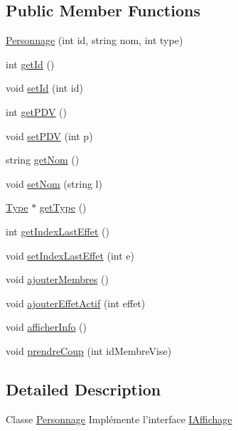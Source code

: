\subsection*{\-Public \-Member \-Functions}
\begin{DoxyCompactItemize}
\item 
\hyperlink{class_personnage_a962f03c014911e25449829891f1e2d15}{\-Personnage} (int id, string nom, int type)
\item 
int \hyperlink{class_personnage_a24fbf035171564c8cb2abff10642d73c}{get\-Id} ()
\item 
void \hyperlink{class_personnage_a5eaaea57f901cf1f04c1ee4752f03007}{set\-Id} (int id)
\item 
int \hyperlink{class_personnage_a8e5dab03a028a1c04b692f737c495979}{get\-P\-D\-V} ()
\item 
void \hyperlink{class_personnage_ada4855cf75754881b579a3a84aba2f47}{set\-P\-D\-V} (int p)
\item 
string \hyperlink{class_personnage_a519301399a9bee1557858aa50a04a85a}{get\-Nom} ()
\item 
void \hyperlink{class_personnage_a73b26b1b2f225f10fba5e1c294f47f8a}{set\-Nom} (string l)
\item 
\hyperlink{class_type}{\-Type} $\ast$ \hyperlink{class_personnage_adc6cc2d57410d41817814775eae0fc7b}{get\-Type} ()
\item 
int \hyperlink{class_personnage_aab567206193ab8e53a6ab8a1a972123f}{get\-Index\-Last\-Effet} ()
\item 
void \hyperlink{class_personnage_a11d434b9150ee0bd6487f34b6afbdf44}{set\-Index\-Last\-Effet} (int e)
\item 
void \hyperlink{class_personnage_a30747012401c2f14d40cbf70da549a50}{ajouter\-Membres} ()
\item 
void \hyperlink{class_personnage_a8025dcfd3f7c0284aae99527267e13c9}{ajouter\-Effet\-Actif} (int effet)
\item 
void \hyperlink{class_personnage_a79ce4d8f13bc64471c553a32f2bb0e2d}{afficher\-Info} ()
\item 
void \hyperlink{class_personnage_ab6d8d089b1e19738e898cf5b346e0bb6}{prendre\-Coup} (int id\-Membre\-Vise)
\end{DoxyCompactItemize}


\subsection{\-Detailed \-Description}
\-Classe \hyperlink{class_personnage}{\-Personnage} \-Implémente l'interface \hyperlink{class_i_affichage}{\-I\-Affichage} 


